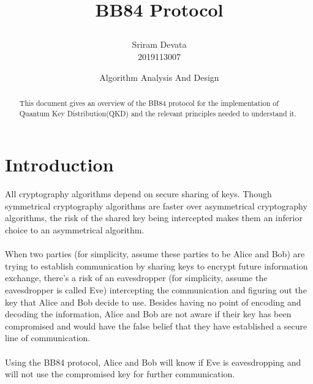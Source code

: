 \documentclass[a4paper]{article}
\begin{document}
	\title{

	\vspace{1cm}
	\Huge BB84 Protocol
	}
	
	\vspace{1cm}
	
	
	\author{\Large {Sriram Devata} \Large \\ 2019113007
	\vspace{0.5cm}}
	
	\date{
	\large Algorithm Analysis And Design \\ 
	\vspace{1cm}
	}

	\maketitle
	\setlength{\parindent}{0pt}

\vspace{8cm}
\begin{abstract}
\begin{center}
This document gives an overview of the BB84 protocol for the implementation of Quantum Key Distribution(QKD) and the relevant principles needed to understand it. 
\end{center}
\end{abstract}
	\newpage
	\tableofcontents
	\newpage
	
\section{Introduction} %
\label{sec:introduction}
All cryptography algorithms depend on secure sharing of keys. Though symmetrical cryptography algorithms are faster over asymmetrical cryptography algorithms, the risk of the shared key being intercepted makes them an inferior choice to an asymmetrical algorithm. 
\\ \\
When two parties (for simplicity, assume these parties to be Alice and Bob) are trying to establish communication by sharing keys to encrypt future information exchange, there's a risk of an eavesdropper (for simplicity, assume the eavesdropper is called Eve) intercepting the communication and figuring out the key that Alice and Bob decide to use. Besides having no point of encoding and decoding the information, Alice and Bob are not aware if their key has been compromised and would have the false belief that they have established a secure line of communication.
\\ \\
Using the BB84 protocol, Alice and Bob will know if Eve is eavesdropping and will not use the compromised key for further communication.
\end{document}

